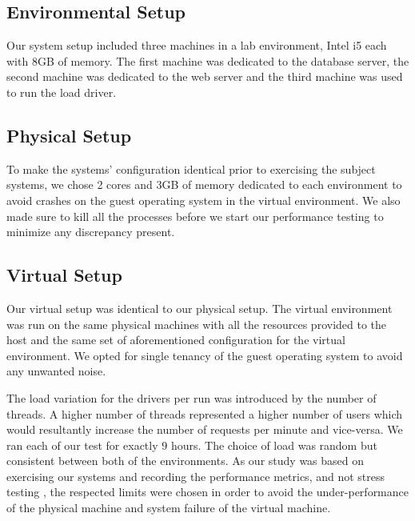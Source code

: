 \subsection{Environmental Setup}
Our system setup included three machines in a lab environment, Intel i5 each with 8GB of memory. The first machine was dedicated to the database server, the second machine was dedicated to the web server and the third machine was used to run the load driver.
\subsection{Physical Setup}
To make the systems' configuration identical prior to exercising the subject systems, we chose 2 cores and 3GB of memory dedicated to each environment to avoid crashes on the guest operating system in the virtual environment. We also made sure to kill all the processes before we start our performance testing to minimize any discrepancy present.
\subsection{Virtual Setup}
Our virtual setup was identical to our physical setup. The virtual environment was run on the same physical machines with all the resources provided to the host and the same set of aforementioned configuration for the virtual environment. We opted for single tenancy of the guest operating system to avoid any unwanted noise. 


The load variation for the drivers per run was introduced by the number of threads. A higher number of threads represented a higher number of users which would resultantly increase the number of requests per minute and vice-versa. We ran each of our test for exactly 9 hours. The choice of load was random but consistent between both of the environments. As our study was based on exercising our systems and recording the performance metrics, and not stress testing \cite{stresstesting}, the respected limits were chosen in order to avoid the under-performance of the physical machine and system failure of the virtual machine.



